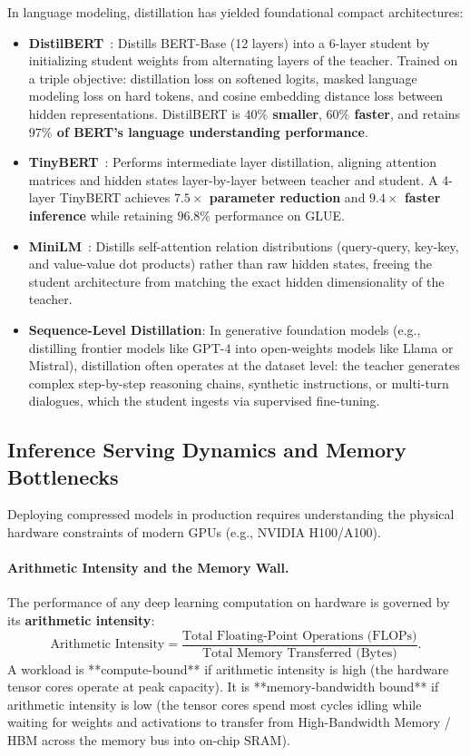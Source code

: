 \documentclass[../../../main.tex]{subfiles}
\begin{document}
In language modeling, distillation has yielded foundational compact architectures:
\begin{itemize}
    \item \textbf{DistilBERT}~\citep{sanh2019distilbert}: Distills BERT-Base (12 layers) into a 6-layer student by initializing student weights from alternating layers of the teacher. Trained on a triple objective: distillation loss on softened logits, masked language modeling loss on hard tokens, and cosine embedding distance loss between hidden representations. DistilBERT is \textbf{$40\%$ smaller}, \textbf{$60\%$ faster}, and retains \textbf{$97\%$ of BERT's language understanding performance}.
    \item \textbf{TinyBERT}~\citep{jiao2020tinybert}: Performs intermediate layer distillation, aligning attention matrices and hidden states layer-by-layer between teacher and student. A 4-layer TinyBERT achieves \textbf{$7.5\times$ parameter reduction} and \textbf{$9.4\times$ faster inference} while retaining $96.8\%$ performance on GLUE.
    \item \textbf{MiniLM}~\citep{wang2020minilm}: Distills self-attention relation distributions (query-query, key-key, and value-value dot products) rather than raw hidden states, freeing the student architecture from matching the exact hidden dimensionality of the teacher.
    \item \textbf{Sequence-Level Distillation}: In generative foundation models (e.g., distilling frontier models like GPT-4 into open-weights models like Llama or Mistral), distillation often operates at the dataset level: the teacher generates complex step-by-step reasoning chains, synthetic instructions, or multi-turn dialogues, which the student ingests via supervised fine-tuning.
\end{itemize}

\subsection{Inference Serving Dynamics and Memory Bottlenecks}
\label{subsec:serving_dynamics_kv_cache}

Deploying compressed models in production requires understanding the physical hardware constraints of modern GPUs (e.g., NVIDIA H100/A100).

\paragraph{Arithmetic Intensity and the Memory Wall.}
The performance of any deep learning computation on hardware is governed by its \textbf{arithmetic intensity}:
\begin{equation}
\label{eq:arithmetic_intensity}
\text{Arithmetic Intensity} = \frac{\text{Total Floating-Point Operations (FLOPs)}}{\text{Total Memory Transferred (Bytes)}}.
\end{equation}
A workload is **compute-bound** if arithmetic intensity is high (the hardware tensor cores operate at peak capacity). It is **memory-bandwidth bound** if arithmetic intensity is low (the tensor cores spend most cycles idling while waiting for weights and activations to transfer from High-Bandwidth Memory / HBM across the memory bus into on-chip SRAM).
\end{document}
